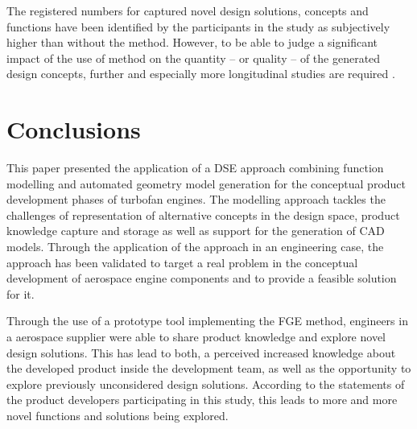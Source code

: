 \documentclass[preprints,article,accept,moreauthors,pdftex]{Definitions/mdpi}
\newcommand{\Jakob}[1]{{{\color{orange}{\itshape{#1}}\color{black}}
    }{\ignorespaces}}
\begin{document}
The registered numbers for captured novel design solutions, concepts and functions have been identified by the participants in the study as subjectively higher than without the method.
However, to be able to judge a significant impact of the use of method on the quantity -- or quality -- of the generated design concepts, further and especially more longitudinal studies are required \cite{Blessing2002}.



\section{Conclusions}\label{sec:conclusions}
This paper presented the application of a \ac{DSE} approach combining function modelling and automated geometry model generation for the conceptual product development phases of turbofan engines.
The modelling approach tackles the challenges of representation of alternative concepts in the design space, product knowledge capture and storage as well as support for the generation of \ac{CAD} models.
Through the application of the approach in an engineering case, the approach has been validated to target a real problem in the conceptual development of aerospace engine components and to provide a feasible solution for it.

Through the use of a prototype tool implementing the \ac{FGE} method, engineers in a aerospace supplier were able to share product knowledge and explore novel design solutions.
This has lead to both, a perceived increased knowledge about the developed product inside the development team, as well as the opportunity to explore previously unconsidered design solutions.
According to the statements of the product developers participating in this study, this leads to more and more novel functions and solutions being explored.
\end{document}
